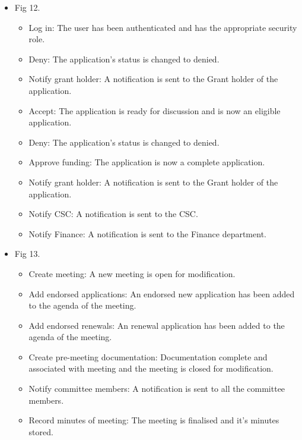 \documentclass[12pt]{article}
\begin{document}
\begin{itemize}
	\item Fig 12.
		\begin{itemize}
			\item Log in: The user has been authenticated and has the appropriate security role.
			\item Deny: The application's status is changed to denied. 
			\item Notify grant holder: A notification is sent to the Grant holder of the application.
			\item Accept: The application is ready for discussion and is now an eligible application.			
			\item Deny: The application's status is changed to denied.			
			\item Approve funding: The application is now a complete application.
			\item Notify grant holder: A notification is sent to the Grant holder of the application.
			\item Notify CSC: A notification is sent to the CSC.
			\item Notify Finance: A notification is sent to the Finance department.									
		\end{itemize}
	
	\item Fig 13.
		\begin{itemize}
			\item Create meeting: A new meeting is open for modification.
			\item Add endorsed applications: An endorsed new application has been added to the agenda of the meeting.
			\item Add endorsed renewals: An renewal application has been added to the agenda of the meeting.
			\item Create pre-meeting documentation: Documentation complete and associated with meeting and the meeting is closed for modification.
			\item Notify committee members: A notification is sent to all the committee members.
			\item Record minutes of meeting: The meeting is finalised and it's minutes stored.							
		\end{itemize}

\end{itemize}


\vspace{0.2in}

\end{document}

